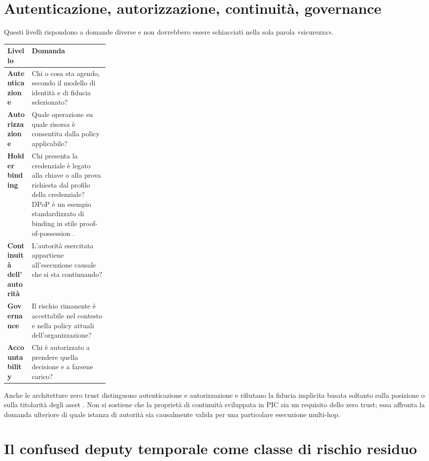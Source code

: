 \documentclass[10pt,oneside,openany]{book}
\begin{document}
\section{Autenticazione, autorizzazione, continuità, governance}

Questi livelli rispondono a domande diverse e non dovrebbero essere schiacciati nella sola parola «sicurezza».

\begin{center}
\small
\begin{tabularx}{0.96\linewidth}{>{\bfseries}p{0.24\linewidth} Y}
\toprule
Livello & Domanda \\
\midrule
Autenticazione & Chi o cosa sta agendo, secondo il modello di identità e di fiducia selezionato? \\
Autorizzazione & Quale operazione su quale risorsa è consentita dalla policy applicabile? \\
Holder binding & Chi presenta la credenziale è legato alla chiave o alla prova richiesta dal profilo della credenziale? DPoP è un esempio standardizzato di binding in stile proof-of-possession \cite{rfc9449}. \\
Continuità dell'autorità & L'autorità esercitata appartiene all'esecuzione causale che si sta continuando? \\
Governance & Il rischio rimanente è accettabile nel contesto e nella policy attuali dell'organizzazione? \\
Accountability & Chi è autorizzato a prendere quella decisione e a farsene carico? \\
\bottomrule
\end{tabularx}
\end{center}

Anche le architetture zero trust distinguono autenticazione e autorizzazione e rifiutano la fiducia implicita basata soltanto sulla posizione o sulla titolarità degli asset \cite{nistzta2020}. Non si sostiene che la proprietà di continuità sviluppata in PIC sia un requisito dello zero trust; essa affronta la domanda ulteriore di quale istanza di autorità sia causalmente valida per una particolare esecuzione multi-hop.

\section{Il confused deputy temporale come classe di rischio residuo}
\end{document}
